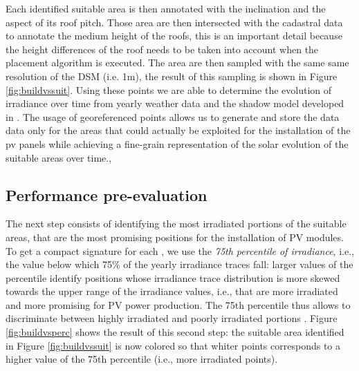 Each identified suitable area is then annotated with the inclination and the aspect of its roof pitch. Those area are then intersected with the cadastral data to annotate the medium height of the roofs, this is an important detail because the height differences of the roof needs to be taken into account when the placement algorithm is executed. The area are then sampled with the same same resolution of the DSM (i.e. 1m), the result of this sampling is shown in Figure \ref{fig:buildvssuit}. Using these points we are able to determine the evolution of irradiance over time from yearly weather data and the shadow model developed in \cite{7997730}. The usage of georeferenced points allows us to generate and store the data data only for the areas that could actually be exploited for the installation of the pv panels while achieving a fine-grain representation of the solar evolution of the suitable areas over time., 



\subsection{Performance pre-evaluation}
The next step consists of identifying the most irradiated portions of the suitable areas, that are the most promising positions for the installation of PV modules. To get a compact signature for each , we use the \emph{75th percentile of irradiance}, i.e., the
value below which 75\% of the yearly irradiance traces fall: larger values of the percentile identify positions whose irradiance trace distribution is more skewed towards the upper range of the irradiance values, i.e., that are more irradiated and more promising for PV power production. 
The 75th percentile thus allows to discriminate between highly irradiated and poorly irradiated portions \cite{8342049_OMITTED}. Figure \ref{fig:buildvsperc} shows the result of this second step: the suitable area identified in Figure \ref{fig:buildvssuit} is now colored so that whiter points corresponds to a higher value of the 75th percentile (i.e., more irradiated points). 

